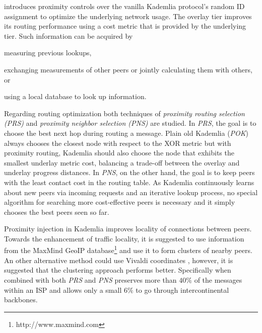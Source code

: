 \cite{KLKP2008} introduces proximity
controls over the vanilla Kademlia protocol's random ID assignment to
optimize the underlying network usage.
The overlay tier improves its routing performance using a cost metric that is
provided by the underlying tier. Such information can be acquired by
\begin{inparaenum}
  \item measuring previous lookups,
  \item exchanging measurements of other peers or jointly calculating them with
  others, or
  \item using a local database to look up information.
\end{inparaenum}

Regarding routing optimization both techniques of \emph{proximity routing
selection (PRS)} and \emph{proximity neighbor selection (PNS)} are studied.
In \emph{PRS}, the goal is to choose the best next hop during routing a message.
Plain old Kademlia (\emph{POK}) always chooses the closest node with respect to
the XOR metric but with proximity routing, Kademlia should also choose the node
that exhibits the smallest underlay metric cost, balancing a trade-off between
the overlay and underlay progress distances.
In \emph{PNS}, on the other hand, the goal is to keep peers with the least
contact cost in the routing table. As Kademlia continuously learns about new
peers via incoming requests and an iterative lookup process, no special
algorithm for searching more cost-effective peers is necessary and it simply
chooses the best peers seen so far.

Proximity injection in Kademlia improves locality of connections between peers.
Towards the enhancement of traffic locality, it is suggested to use information
from the MaxMind GeoIP database\footnote{http://www.maxmind.com} and use it to
form clusters of nearby peers. An other alternative method could use Vivaldi
coordinates \cite{cox_vivaldi_2004}, however, it is suggested that the
clustering approach performs better. Specifically when combined with both
\emph{PRS} and \emph{PNS} preserves more than $40\%$ of the messages within an
ISP and allows only a small $6\%$ to go through intercontinental backbones.

